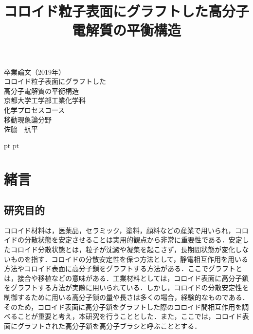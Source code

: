 \documentclass[10.5pt,a4j]{jarticle}
\title{コロイド粒子表面にグラフトした高分子電解質の平衡構造}
\begin{document}
\begin{titlepage}
\begin{center}
\vspace*{50truept}
{\huge 卒業論文（2019年）} \\
\vspace*{100truept}
{\huge コロイド粒子表面にグラフトした\\高分子電解質の平衡構造}\\
\vspace{120truept}
{\LARGE 京都大学工学部工業化学科\\化学プロセスコース}\\
{\LARGE 移動現象論分野}\\
\vspace{50truept}
{\LARGE 佐脇　航平}\\
\vspace{50truept}
\end{center}
\end{titlepage}
\tableofcontents
\clearpage



 pt
 pt

\section{緒言}
\subsection{研究目的}
コロイド材料は，医薬品，セラミック，塗料，顔料などの産業で用いられ，コロイドの分散状態を安定させることは実用的観点から非常に重要性である．安定したコロイド分散状態とは，粒子が沈澱や凝集を起こさず，長期間状態が変化しないものを指す．コロイドの分散安定性を保つ方法として，静電相互作用を用いる方法やコロイド表面に高分子鎖をグラフトする方法がある．ここでグラフトとは，接合や移植などの意味がある．工業材料としては，コロイド表面に高分子鎖をグラフトする方法が実際に用いられている．しかし，コロイドの分散安定性を制御するために用いる高分子鎖の量や長さは多くの場合，経験的なものである．そのため，コロイド表面に高分子鎖をグラフトした際のコロイド間相互作用を調べることが重要と考え，本研究を行うこととした．また，ここでは，コロイド表面にグラフトされた高分子鎖を高分子ブラシと呼ぶこととする．
\end{document}
